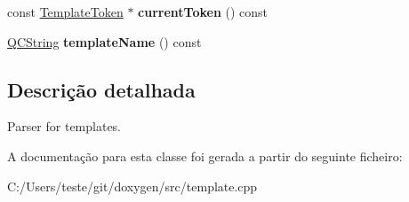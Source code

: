 \begin{DoxyCompactItemize}
\item 
\hypertarget{class_template_parser_acfad5f0c3a18bd02142a49eddacc3962}{const \hyperlink{class_template_token}{Template\-Token} $\ast$ {\bfseries current\-Token} () const }\label{class_template_parser_acfad5f0c3a18bd02142a49eddacc3962}

\item 
\hypertarget{class_template_parser_a252629acf6dbf0a69894af5f525da4a1}{\hyperlink{class_q_c_string}{Q\-C\-String} {\bfseries template\-Name} () const }\label{class_template_parser_a252629acf6dbf0a69894af5f525da4a1}

\end{DoxyCompactItemize}


\subsection{Descrição detalhada}
Parser for templates. 

A documentação para esta classe foi gerada a partir do seguinte ficheiro\-:\begin{DoxyCompactItemize}
\item 
C\-:/\-Users/teste/git/doxygen/src/template.\-cpp\end{DoxyCompactItemize}
